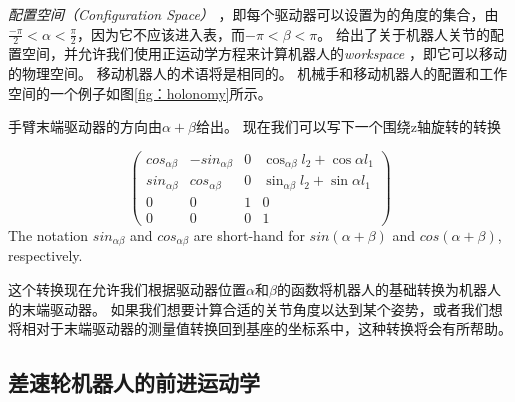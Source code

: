 \emph {配置空间（Configuration Space）}  ，即每个驱动器可以设置为的角度的集合，由$\frac{-\pi}{2} <\alpha <\frac{\pi}{2}$，因为它不应该进入表，而$-\pi <\beta <\pi$。 给出了关于机器人关节的配置空间，并允许我们使用正运动学方程来计算机器人的\emph{workspace} ，即它可以移动的物理空间。 移动机器人的术语将是相同的。 机械手和移动机器人的配置和工作空间的一个例子如图\ref {fig：holonomy}所示。


手臂末端驱动器的方向由$ \alpha + \beta $给出。 现在我们可以写下一个围绕z轴旋转的转换

\begin{equation}
\label{eq:2armtrans}
\left(\begin{array}{llll}cos_{\alpha\beta} & -sin_{\alpha\beta} &  0 & \cos_{\alpha\beta}l_2+\cos\alpha l_1\\
                        sin_{\alpha\beta} & cos_{\alpha\beta} & 0 & \sin_{\alpha\beta}l_2+\sin\alpha l_1\\
												0 & 0 & 1 & 0\\
												0 & 0 & 0 & 1\end{array}\right)
\end{equation}
The notation $sin_{\alpha\beta}$ and $cos_{\alpha\beta}$ are short-hand for $sin(\alpha+\beta)$ and $cos(\alpha+\beta)$, respectively.


这个转换现在允许我们根据驱动器位置$ \alpha $和$ \beta $的函数将机器人的基础转换为机器人的末端驱动器。 如果我们想要计算合适的关节角度以达到某个姿势，或者我们想将相对于末端驱动器的测量值转换回到基座的坐标系中，这种转换将会有所帮助。

\subsection{差速轮机器人的前进运动学}
\label{sec:fwkmobile}

